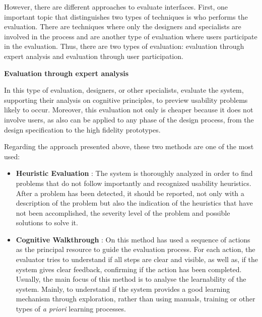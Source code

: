 However, there are different approaches to evaluate interfaces. First, one important topic that distinguishes two types of techniques is who performs the evaluation. There are techniques where only the designers and specialists are involved in the process and are another type of evaluation where users participate in the evaluation. \cite{humanComputerInteraction} Thus, there are two types of evaluation: evaluation through expert analysis and evaluation through user participation.

\bigskip

\textbf{Evaluation through expert analysis}

In this type of evaluation, designers, or other specialists, evaluate the system, supporting their analysis on cognitive principles, to preview usability problems likely to occur. Moreover, this evaluation not only is cheaper because it does not involve users, as also can be applied to any phase of the design process, from the design specification to the high fidelity prototypes. \cite{humanComputerInteraction}

Regarding the approach presented above, these two methods are one of the most used:

\begin{itemize}
	\item \textbf{Heuristic Evaluation} \cite{heuristicEvaluationOfUserInterfaces}: The system is thoroughly analyzed in order to find problems that do not follow importantly and recognized usability heuristics. After a problem has been detected, it should be reported, not only with a description of the problem but also the indication of the heuristics that have not been accomplished, the severity level of the problem and possible solutions to solve it. \cite{usabilityEngineering}
	\item \textbf{Cognitive Walkthrough} \cite{cognitiveWalkthroughs}: On this method has used a sequence of actions as the principal resource to guide the evaluation process. For each action, the evaluator tries to understand if all steps are clear and visible, as well as, if the system gives clear feedback, confirming if the action has been completed. Usually, the main focus of this method is to analyse the learnability of the system. Mainly, to understand if the system provides a good learning mechanism through exploration, rather than using manuals, training or other types of \textit{a priori} learning processes. \cite{humanComputerInteraction}
\end{itemize}

